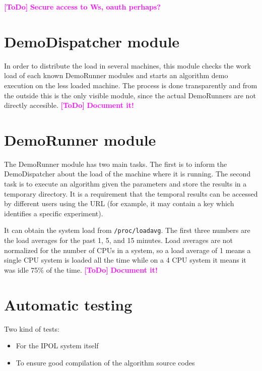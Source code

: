 \documentclass[a4paper,12pt]{article}
\newcommand{\ToDo}[1]{\textcolor{magenta}{\textbf{[ToDo]} \textbf{#1}}}
\begin{document}











\ToDo{Secure access to Ws, oauth perhaps?}

\section{DemoDispatcher module}
In order to distribute the load in several machines, this module checks the work load of each known DemoRunner modules and starts an algorithm demo execution on the less loaded machine. The process is done transparently and from the outside this is the only visible module, since the actual DemoRunners are not directly accesible.
\ToDo{Document it!}

\section{DemoRunner module}
The DemoRunner module has two main tasks. The first is to inform the DemoDispatcher about the load of the machine where it is running. The second task is to execute an algorithm given the parameters and store the results in a temporary directory. It is a requirement that the temporal results can be accessed by different users using the URL (for example, it may contain a key which identifies a specific experiment).

It can obtain the system load from {\tt /proc/loadavg}. The first three numbers are the load averages for the past 1, 5, and 15 minutes. Load averages are not normalized for the number of CPUs in a system, so a load  average  of 1 means a single CPU system is loaded all the time while on a 4 CPU system it means it was idle 75\% of the time.
\ToDo{Document it!}






\section{Automatic testing}
Two kind of tests:
\begin{itemize}
  \item For the IPOL system itself
  \item To ensure good compilation of the algorithm source codes
\end{itemize}
\end{document}
